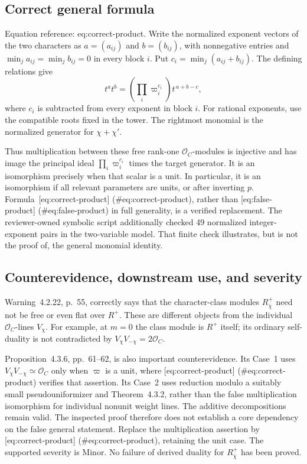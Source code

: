 \documentclass[10pt]{article}
\begin{document}
\subsection*{Correct general formula}
Equation reference: eq:correct-product. Write the normalized exponent vectors of the two characters as \(a=(a_{ij})\) and \(b=(b_{ij})\), with nonnegative entries and \(\min_j a_{ij}=\min_j b_{ij}=0\) in every block \(i\). Put \(c_i=\min_j(a_{ij}+b_{ij})\). The defining relations give \[
t^a t^b=\left(\prod_i\varpi_i^{c_i}\right)t^{\,a+b-c},\] where \(c_i\) is subtracted from every exponent in block \(i\). For rational exponents, use the compatible roots fixed in the tower. The rightmost monomial is the normalized generator for \(\chi+\chi'\).\par
Thus multiplication between these free rank-one \(\mathcal O_C\)-modules is injective and has image the principal ideal \(\prod_i\varpi_i^{c_i}\) times the target generator. It is an isomorphism precisely when that scalar is a unit. In particular, it is an isomorphism if all relevant parameters are units, or after inverting \(p\). Formula [eq:correct-product] (\#eq:correct-product), rather than [eq:false-product] (\#eq:false-product) in full generality, is a verified replacement. The reviewer-owned symbolic script additionally checked 49 normalized integer-exponent pairs in the two-variable model. That finite check illustrates, but is not the proof of, the general monomial identity.\par
\subsection*{Counterevidence, downstream use, and severity}
Warning 4.2.22, p. 55, correctly says that the character-class modules \(R^+_{\bar\chi}\) need not be free or even flat over \(R^+\). These are different objects from the individual \(\mathcal O_C\)-lines \(V_\chi\). For example, at \(m=0\) the class module is \(R^+\) itself; its ordinary self-duality is not contradicted by \(V_\chi V_{-\chi}=2\mathcal O_C\).\par
Proposition 4.3.6, pp. 61–62, is also important counterevidence. Its Case 1 uses \(V_\chi V_{-\chi}\simeq\mathcal O_C\) only when \(\varpi\) is a unit, where [eq:correct-product] (\#eq:correct-product) verifies that assertion. Its Case 2 uses reduction modulo a suitably small pseudouniformizer and Theorem 4.3.2, rather than the false multiplication isomorphism for individual nonunit weight lines. The additive decompositions remain valid. The inspected proof therefore does not establish a core dependency on the false general statement. Replace the multiplication assertion by [eq:correct-product] (\#eq:correct-product), retaining the unit case. The supported severity is Minor. No failure of derived duality for \(R^+_{\bar\chi}\) has been proved.\par
\end{document}
